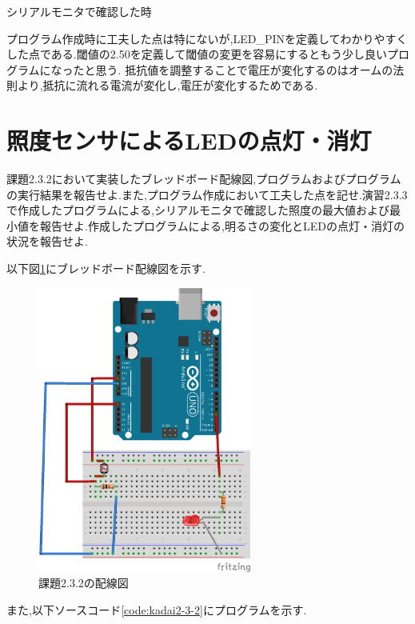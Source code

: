 \documentclass{jarticle}
\begin{document}
シリアルモニタで確認した時

プログラム作成時に工夫した点は特にないが,LED\_PINを定義してわかりやすくした点である.閾値の2.50を定義して閾値の変更を容易にするともう少し良いプログラムになったと思う.
抵抗値を調整することで電圧が変化するのはオームの法則より,抵抗に流れる電流が変化し,電圧が変化するためである.

\section{照度センサによるLEDの点灯・消灯}

課題2.3.2において実装したブレッドボード配線図,プログラムおよびプログラムの実行結果を報告せよ.また,プログラム作成において工夫した点を記せ.演習2.3.3で作成したプログラムによる,シリアルモニタで確認した照度の最大値および最小値を報告せよ.作成したプログラムによる,明るさの変化とLEDの点灯・消灯の状況を報告せよ.

以下図\ref{fig:kadai2-3-2bread}にブレッドボード配線図を示す.

\begin{figure}[H]
\begin{center}
\includegraphics[width=7.0cm]{images/kadai2-3-2_bread.png}
\caption{課題2.3.2の配線図}
\label{fig:kadai2-3-2bread}
\end{center}
\end{figure}

また,以下ソースコード\ref{code:kadai2-3-2}にプログラムを示す.
\end{document}
